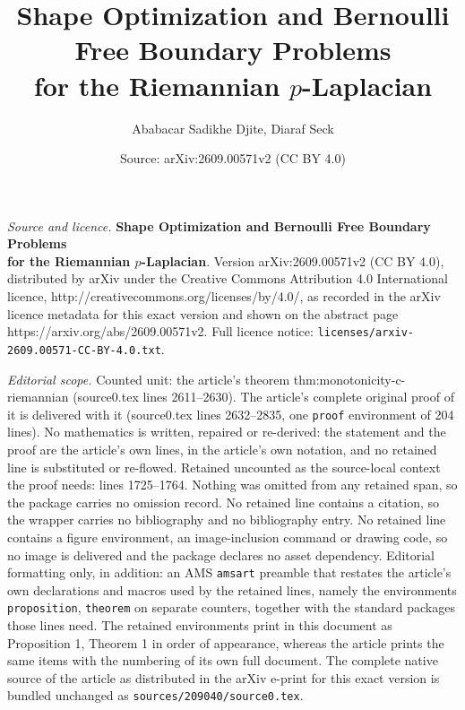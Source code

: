 \documentclass[10pt,a4paper]{amsart}
\title{\textbf{Shape Optimization and Bernoulli Free Boundary Problems\\ for the Riemannian $p$-Laplacian}}
\author{Ababacar Sadikhe Djite, Diaraf Seck}
\date{Source: arXiv:2609.00571v2 (CC BY 4.0)}
\begin{document}
\maketitle

\noindent\emph{Source and licence.} \textbf{Shape Optimization and Bernoulli Free Boundary Problems\\ for the Riemannian $p$-Laplacian}. Version arXiv:2609.00571v2 (CC BY 4.0), distributed by arXiv under the Creative Commons Attribution 4.0 International licence, http://creativecommons.org/licenses/by/4.0/, as recorded in the arXiv licence metadata for this exact version and shown on the abstract page https://arxiv.org/abs/2609.00571v2. Full licence notice: \texttt{licenses/arxiv-2609.00571-CC-BY-4.0.txt}.\par\smallskip

\noindent\textit{Editorial scope.} Counted unit: the article's theorem thm:monotonicity-c-riemannian (source0.tex lines 2611--2630). The article's complete original proof of it is delivered with it (source0.tex lines 2632--2835, one \texttt{proof} environment of 204 lines). No mathematics is written, repaired or re-derived: the statement and the proof are the article's own lines, in the article's own notation, and no retained line is substituted or re-flowed.  Retained uncounted as the source-local context the proof needs: lines 1725--1764.  Nothing was omitted from any retained span, so the package carries no omission record.  No retained line contains a citation, so the wrapper carries no bibliography and no bibliography entry.  No retained line contains a figure environment, an image-inclusion command or drawing code, so no image is delivered and the package declares no asset dependency.  Editorial formatting only, in addition: an AMS \texttt{amsart} preamble that restates the article's own declarations and macros used by the retained lines, namely the environments \texttt{proposition}, \texttt{theorem} on separate counters, together with the standard packages those lines need.  The retained environments print in this document as Proposition 1, Theorem 1 in order of appearance, whereas the article prints the same items with the numbering of its own full document.  The complete native source of the article as distributed in the arXiv e-print for this exact version is bundled unchanged as \texttt{sources/209040/source0.tex}.
\end{document}

